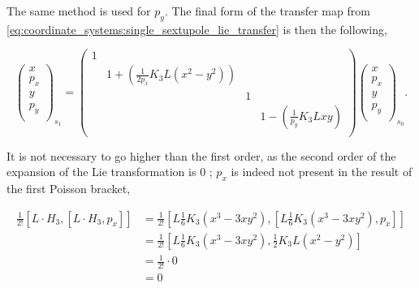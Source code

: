 The same method is used for $p_y$.
The final form of the transfer map from \cref{eq:coordinate_systems:single_sextupole_lie_transfer} is
then the following,

\begin{equation}
    \begin{pmatrix}
        x \\
        p_x \\
        y \\
        p_y \\
    \end{pmatrix}_{s_1}
    =
    \begin{pmatrix}
        1 &  &  &  \\
         & 1 + \left(\frac{1}{2 p_x}K_3L(x^2-y^2)\right) &  & \\
         & & 1 & \\
         & &  & 1 - \left(\frac{1}{p_y}K_3Lxy\right)\\ 
    \end{pmatrix}
    \begin{pmatrix}
        x \\
        p_x \\
        y \\
        p_y \\
    \end{pmatrix}_{s_0}.
\end{equation}


It is not necessary to go higher than the first order, as the second order of the expansion of the 
Lie transformation is 0 ; $p_x$ is indeed not present in the result of the first Poisson bracket,

\begin{equation}
    \begin{aligned}
    \frac{1}{2!} [L \cdot H_3, [L \cdot H_3, p_x]]
    &= \frac{1}{2!}\left[L \frac{1}{6} K_3 (x^3 - 3xy^2), \left[L \frac{1}{6} K_3 (x^3 - 3xy^2), p_x\right]\right] \\
    &= \frac{1}{2!}\left[L \frac{1}{6} K_3 (x^3 - 3xy^2), \frac{1}{2} K_3 L (x^2 - y^2)\right] \\
    &= \frac{1}{2!} \cdot 0 \\
    &= 0
    \end{aligned}
\end{equation}



\subsection{}

